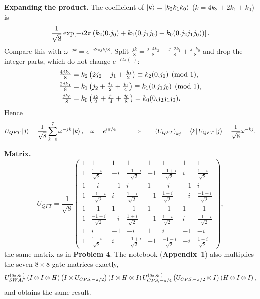 \documentclass[a4paper, 10pt]{article}
\begin{document}
\begin{solution}
	\noindent \textbf{Expanding the product.} The coefficient of \( \ket{k} = \ket{k_2k_1k_0} \) (\( k = 4k_2 + 2k_1 + k_0 \)) is
	\[
		\frac{1}{\sqrt{8}}\exp\!\left[-i2\pi\left(k_2(0.j_0) + k_1(0.j_1j_0) + k_0(0.j_2j_1j_0)\right)\right].
	\]
	Compare this with \( \omega^{-jk} = e^{-i2\pi jk/8} \). Split \( \tfrac{jk}{8} = \tfrac{j \cdot 4k_2}{8} + \tfrac{j \cdot 2k_1}{8} + \tfrac{j \cdot k_0}{8} \) and drop the integer parts, which do not change \( e^{-i2\pi(\cdot)} \):
	\begin{align*}
		\tfrac{4jk_2}{8} & = k_2\left(2j_2 + j_1 + \tfrac{j_0}{2}\right) \equiv k_2(0.j_0) \pmod 1,                                 \\
		\tfrac{2jk_1}{8} & = k_1\left(j_2 + \tfrac{j_1}{2} + \tfrac{j_0}{4}\right) \equiv k_1(0.j_1j_0) \pmod 1,                    \\
		\tfrac{jk_0}{8}  & = k_0\left(\tfrac{j_2}{2} + \tfrac{j_1}{4} + \tfrac{j_0}{8}\right) = k_0(0.j_2j_1j_0).
	\end{align*}
	Hence
	\[
		U_{QFT}\ket{j} = \frac{1}{\sqrt{8}}\sum_{k = 0}^{7}\omega^{-jk}\ket{k}, \quad \omega = e^{i\pi/4}
		\qquad \Longrightarrow \qquad
		\left(U_{QFT}\right)_{kj} = \bra{k}U_{QFT}\ket{j} = \frac{1}{\sqrt{8}}\omega^{-kj}.
	\]

	\myspace

	\noindent \textbf{Matrix.}
	\[
		U_{QFT} = \frac{1}{\sqrt{8}}\begin{pmatrix}
			1 & 1                     & 1  & 1                      & 1  & 1                      & 1  & 1                     \\
			1 & \frac{1 - i}{\sqrt{2}} & -i & \frac{-1 - i}{\sqrt{2}} & -1 & \frac{-1 + i}{\sqrt{2}} & i  & \frac{1 + i}{\sqrt{2}} \\
			1 & -i                    & -1 & i                      & 1  & -i                     & -1 & i                     \\
			1 & \frac{-1 - i}{\sqrt{2}} & i  & \frac{1 - i}{\sqrt{2}}  & -1 & \frac{1 + i}{\sqrt{2}}  & -i & \frac{-1 + i}{\sqrt{2}} \\
			1 & -1                    & 1  & -1                     & 1  & -1                     & 1  & -1                    \\
			1 & \frac{-1 + i}{\sqrt{2}} & -i & \frac{1 + i}{\sqrt{2}}  & -1 & \frac{1 - i}{\sqrt{2}}  & i  & \frac{-1 - i}{\sqrt{2}} \\
			1 & i                     & -1 & -i                     & 1  & i                      & -1 & -i                    \\
			1 & \frac{1 + i}{\sqrt{2}} & i  & \frac{-1 + i}{\sqrt{2}} & -1 & \frac{-1 - i}{\sqrt{2}} & -i & \frac{1 - i}{\sqrt{2}}
		\end{pmatrix},
	\]
	the same matrix as in \textbf{Problem 4}. The notebook (\textbf{Appendix~1}) also multiplies the seven \( 8 \times 8 \) gate matrices exactly,
	\[
		U_{SWAP}^{(q_2, q_0)}\left(I \otimes I \otimes H\right)\left(I \otimes U_{CPS, -\pi/2}\right)\left(I \otimes H \otimes I\right)
		U_{CPS, -\pi/4}^{(q_2, q_0)}\left(U_{CPS, -\pi/2} \otimes I\right)\left(H \otimes I \otimes I\right),
	\]
	and obtains the same result.
\end{solution}
\end{document}
